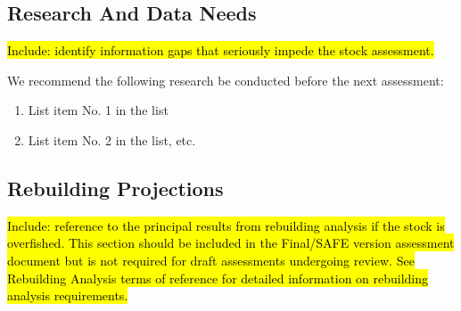 \documentclass[12pt,]{article}
\begin{document}
\FloatBarrier

\newpage

\subsection*{Research And Data Needs}\label{research-and-data-needs}

\hl{Include: identify information gaps that seriously impede the stock assessment.}

We recommend the following research be conducted before the next
assessment:

\begin{enumerate}

\item List item No. 1 in the list

\item List item No. 2 in the list, etc.

\end{enumerate}

\subsection*{Rebuilding Projections}\label{rebuilding-projections}

\hl{Include: reference to the principal results from rebuilding analysis if the 
stock is overfished. This section should be included in the Final/SAFE version 
assessment document but is not required for draft assessments undergoing review. 
See Rebuilding Analysis terms of reference for detailed information on 
rebuilding analysis requirements.}

\FloatBarrier

\newpage

\renewcommand{\thefigure}{\arabic{figure}}
\renewcommand{\thetable}{\arabic{table}}

\setcounter{figure}{0} \setcounter{table}{0} 

\section{}\label{section-1}

\section{}\label{section-2}
\end{document}
